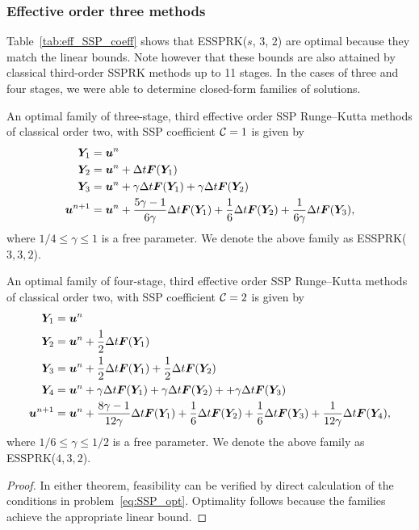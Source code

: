 \subsubsection{Effective order three methods}\label{subsubsec:3rd_ESSPRK}
Table~\ref{tab:eff_SSP_coeff} shows that ESSPRK($s$, $3$, $2$) are optimal because they match the linear bounds. 
Note however that these bounds are also attained by classical third-order SSPRK methods up to 11 stages. 
In the cases of three and four stages, we were able to determine closed-form families of solutions.
\begin{theorem}\label{thm:ESSPRK(3,3,2)}
	An optimal family of three-stage, third effective order SSP Runge--Kutta methods of 
	classical order two, with SSP coefficient $\mathcal{C}=1$ is given by
    \begin{displaymath}
    		\begin{split}
    			\bm{Y}_1 &= \bm{u}^n \\
    			\bm{Y}_2 &= \bm{u}^n + \Delta t\bm{F}(\bm{Y}_1) \\
    			\bm{Y}_3 &= \bm{u}^n + \gamma\Delta t\bm{F}(\bm{Y}_1) + \gamma\Delta t\bm{F}(\bm{Y}_2) \\
    			\bm{u}^{n+1} &= \bm{u}^n + \frac{5\gamma-1}{6\gamma}\Delta t\bm{F}(\bm{Y}_1) + \frac{1}{6}\Delta t\bm{F}(\bm{Y}_2) + \frac{1}{6\gamma}\Delta t\bm{F}(\bm{Y}_3),
        \end{split}
    \end{displaymath}
    where $1/4 \leq \gamma \leq 1$ is a free parameter. We denote the above family as 
    ESSPRK($3,3,2$).
\end{theorem}
\begin{theorem}\label{thm:ESSPRK(4,3,2)}
	An optimal family of four-stage, third effective order SSP Runge--Kutta methods of 
	classical order two, with SSP coefficient $\mathcal{C}=2$ is given by
    \begin{displaymath}
    		\begin{split}
    			\bm{Y}_1 &= \bm{u}^n \\
    			\bm{Y}_2 &= \bm{u}^n + \frac{1}{2}\Delta t\bm{F}(\bm{Y}_1) \\
    			\bm{Y}_3 &= \bm{u}^n + \frac{1}{2}\Delta t\bm{F}(\bm{Y}_1) + \frac{1}{2}\Delta t\bm{F}(\bm{Y}_2) \\
    			\bm{Y}_4 &= \bm{u}^n + \gamma\Delta t\bm{F}(\bm{Y}_1) + \gamma\Delta t\bm{F}(\bm{Y}_2) + + \gamma\Delta t\bm{F}(\bm{Y}_3) \\
    			\bm{u}^{n+1} &= \bm{u}^n + \frac{8\gamma-1}{12\gamma}\Delta t\bm{F}(\bm{Y}_1) + \frac{1}{6}\Delta t\bm{F}(\bm{Y}_2) + \frac{1}{6}\Delta t\bm{F}(\bm{Y}_3) + \frac{1}{12\gamma}\Delta t\bm{F}(\bm{Y}_4),
        \end{split}
    \end{displaymath}
    where $ 1/6 \leq \gamma \leq 1/2 $ is a free parameter. We denote the above family as 
    ESSPRK($4,3,2$).
\end{theorem}
\begin{proof}
	In either theorem, feasibility can be verified by direct calculation of the conditions in 
	problem~\eqref{eq:SSP_opt}. Optimality follows because the families achieve the 
	appropriate linear bound.
\end{proof}

